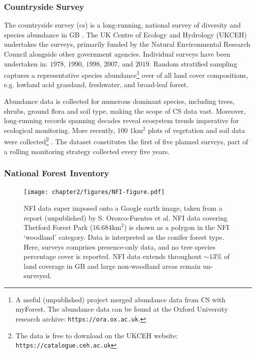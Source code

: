 \subsubsection{Countryside Survey}

The countryside survey (\acrshort{cs}) is a long-running, national survey of diversity and species abundance in GB \cite{wood2017long}.
The UK Centre of Ecology and Hydrology (UKCEH) undertakes the surveys, primarily funded by the Natural Environmental Research Council alongside other government agencies.
Individual surveys have been undertaken in: $1978$, $1990$, $1998$, $2007$, and $2019$. 
Random stratified sampling captures a representative species abundance\footnote{
A useful (unpublished) project merged abundance data from CS with myForest. The abundance data can be found at the Oxford University research archive: \nolinkurl{https://ora.ox.ac.uk}.} 
over of all land cover compositions, e.g. lowland acid grassland, freshwater, and broad-leaf forest.

Abundance data is collected for numerous dominant species, including trees, shrubs, ground flora and soil type, 
making the scope of CS data vast. Moreover, long-running records spanning decades reveal ecosystem trends imperative for ecological monitoring.
More recently, $100$ $1\mathrm{km^2}$ plots of vegetation and soil data were collected\footnote{
The data is free to download on the UKCEH website: \nolinkurl{https://catalogue.ceh.ac.uk}} \cite{10.5285/fd6ae272-aeb5-4573-8e8a-7ccfae64f506}.
The dataset constitutes the first of five planned surveys, part of a rolling monitoring strategy collected every five years.

\subsubsection{National Forest Inventory}

\begin{figure}
    \centering
    \texttt{[image: chapter2/figures/NFI-figure.pdf]}
    \caption{NFI data super imposed onto a Google earth image, taken from a report (unpublished) by S. Orozco-Fuentes et al.
             NFI data covering Thetford Forest Park ($16.684 \mathrm{km}^2$) is shown as a polygon in the NFI `woodland' category.
             Data is interpreted as the conifer forest type. Here, surveys comprises presence-only data, and no tree species percentage cover
             is reported. NFI data extends throughout $\sim 13\%$ of land coverage in GB and large non-woodland areas remain un-surveyed.}
    \label{fig:NFI-data}
\end{figure}

